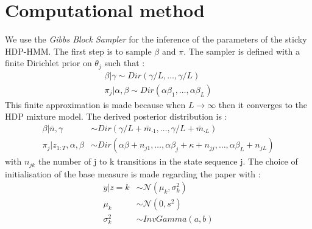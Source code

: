 \section{Computational method}
We use the \textit{Gibbs Block Sampler} \cite{fox_sticky_2011} for the inference of the parameters of the sticky HDP-HMM. The first step is to sample $\beta$ and $\pi$. The sampler is defined with a finite Dirichlet prior on $\theta_j$ such that : 
\begin{align*}
	\beta | \gamma \sim Dir(\gamma/L, \dots, \gamma/L) \\
	\pi_j | \alpha, \beta \sim Dir (\alpha\beta_1, \dots, \alpha\beta_L)
\end{align*}
This finite approximation is made because when $L\to\infty$ then it converges to the HDP mixture model. The derived posterior distribution is : 
\begin{align*}
	\beta|\bar{n},\gamma &\sim Dir(\gamma/L+\bar m_{\cdot1}, \dots, \gamma/L+ \bar m_{\cdot L}) \\
	\pi_j | z_{1:T},\alpha, \beta &\sim Dir(\alpha\beta+n_{j1}, \dots, \alpha\beta_j+\kappa + n_{jj}, \dots, \alpha \beta_L+n_{jL})
\end{align*}
with $n_{jk}$ the number of j to k transitions in the state sequence j.
The choice of initialisation of the base measure is made regarding the paper with : 
\begin{equation}
	\label{equ:basemeasure}
\begin{split}
	y|z=k&\sim \mathcal N (\mu_k, \sigma_k^2) \\
	\mu_k &\sim \mathcal N (0, s^2) \\
	\sigma^2_k &\sim InvGamma(a,b)
\end{split}
\end{equation}
	

